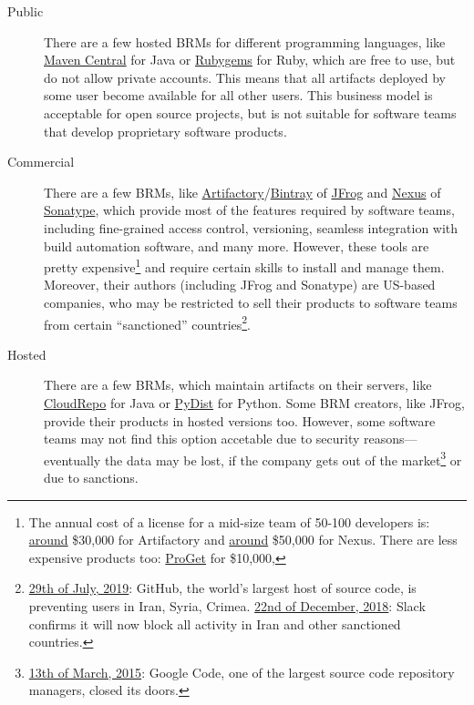 \documentclass[12pt,oneside]{article}
\begin{document}
\begin{description}
  \item[Public]
  There are a few hosted BRMs for different programming languages, like
  \href{https://search.maven.org/}{Maven Central} for Java or
  \href{https://www.rubygems.org}{Rubygems} for Ruby, which are free to use,
  but do not allow private accounts. This means that all artifacts deployed
  by some user become available for all other users. This business model is
  acceptable for open source projects, but is not suitable for software teams
  that develop proprietary software products.

  \item[Commercial]
  There are a few BRMs, like
  \href{https://jfrog.com/artifactory/}{Artifactory}/\href{https://jfrog.com/bintray/}{Bintray}
  of \href{https://jfrog.com}{JFrog}
  and \href{https://www.sonatype.com/nexus-repository-oss}{Nexus}
  of \href{https://www.sonatype.com/}{Sonatype},
  which provide most of the features required by software teams, including
  fine-grained access control, versioning, seamless integration with build
  automation software, and many more. However, these tools are pretty expensive\footnote{%
    The annual cost of a license for a mid-size team of 50-100 developers is:
    \href{https://jfrog.com/pricing/}{around} \$30,000 for Artifactory
    and
    \href{https://www.sonatype.com/product-pricing}{around} \$50,000 for Nexus.
    There are less expensive products too:
    \href{https://inedo.com/proget/pricing}{ProGet} for \$10,000,
  }
  and require certain skills to install and manage them. Moreover, their
  authors (including JFrog and Sonatype) are US-based companies, who may be
  restricted to sell their products to software teams from certain ``sanctioned'' countries\footnote{%
    \href{https://techcrunch.com/2019/07/29/github-ban-sanctioned-countries/}{29th of July, 2019}:
    GitHub, the world's largest host of source code, is preventing users in Iran, Syria, Crimea.
    \href{https://techcrunch.com/2018/12/22/slack-says-it-will-comply-with-sanctions/}{22nd of December, 2018}:
    Slack confirms it will now block all activity in Iran and other sanctioned countries.
  }.

  \item[Hosted]
  There are a few BRMs, which maintain artifacts on their servers,
  like \href{https://www.cloudrepo.io/pricing.html}{CloudRepo} for Java
  or \href{https://pydist.com/}{PyDist} for Python.
  Some BRM creators, like JFrog, provide their products in hosted versions too.
  However, some software teams may not find this option accetable
  due to security reasons---eventually the data may be lost, if the company
  gets out of the market\footnote{%
    \href{https://www.theverge.com/2015/3/13/8206903/google-code-is-closing-down-github-bitbucket}{13th of March, 2015}:
    Google Code, one of the largest source code repository managers, closed its doors.
  }
  or due to sanctions.


\end{description}
\end{document}
